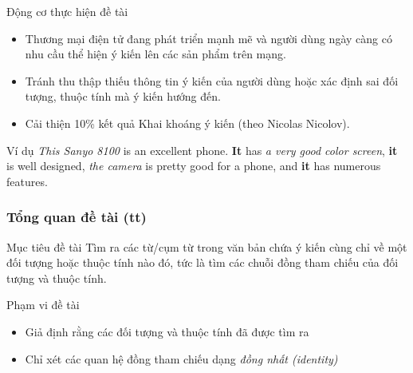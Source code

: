 \documentclass[9pt,xcolor=table,hyperref=unicode]{beamer}
\begin{document}
	\begin{frame}
		\begin{block}{Động cơ thực hiện đề tài}
			\begin{itemize}	
				\item{Thương mại điện tử đang phát triển mạnh mẽ và người dùng ngày càng có nhu cầu thể hiện ý kiến lên các sản phẩm trên mạng.}
				\item{Tránh thu thập thiếu thông tin ý kiến của người dùng hoặc xác định sai đối tượng, thuộc tính mà ý kiến hướng đến.}
				\item{Cải thiện 10\% kết quả Khai khoáng ý kiến (theo Nicolas Nicolov).}
			\end{itemize}		
		\end{block}		
		\begin{block}{Ví dụ}			
			\textit{This Sanyo 8100} is an excellent phone.  \textbf{It} has \textit{a very good color screen}, \textbf{it} is well designed, \textit{the camera} is pretty good for a phone, and \textbf{it} has numerous features.
		\end{block}
	\end{frame}

	\begin{frame}
		\frametitle{Tổng quan đề tài (tt)}
		\begin{block}{Mục tiêu đề tài}
			Tìm ra các từ/cụm từ trong văn bản chứa ý kiến cùng chỉ về một đối tượng hoặc thuộc tính nào đó, tức là tìm các chuỗi đồng tham chiếu của đối tượng và thuộc tính.
		\end{block}		
		\begin{block}{Phạm vi đề tài}
			\begin{itemize}
				\item{Giả định rằng các đối tượng và thuộc tính đã được tìm ra}
				\item{Chỉ xét các quan hệ đồng tham chiếu dạng \textit{đồng nhất (identity)}}
			\end{itemize}
		\end{block}
	\end{frame}
\end{document}
